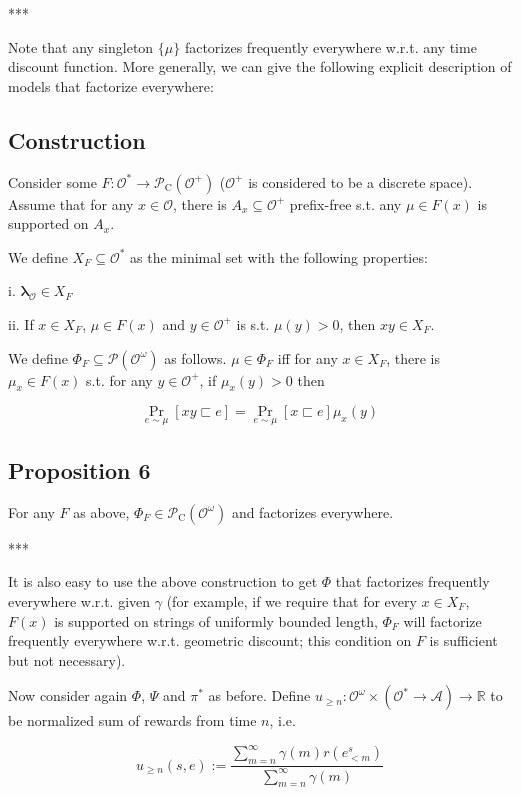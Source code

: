 \documentclass[a4paper]{article}
\DeclareMathOperator{\Prb}{Pr}
\newcommand{\Reals}{\mathbb{R}}
\newcommand{\Estr}{\bm{\lambda}}
\newcommand{\Prob}{\mathcal{P}}
\newcommand{\Act}{\mathcal{A}}
\newcommand{\Obs}{\mathcal{O}}
\newcommand{\ObsO}{\Obs^\omega}
\newcommand{\Pol}{\Obs^* \rightarrow \Act}
\newcommand{\CC}{\mathcal{P}_{\operatorname{C}}}
\begin{document}
***

Note that any singleton ${\{\mu\}}$ factorizes frequently everywhere w.r.t. any time discount function. More generally, we can give the following explicit description of models that factorize everywhere:

\subsection{Construction}

Consider some ${F: \Obs^* \rightarrow \CC(\Obs^+)}$ (${\Obs^+}$ is considered to be a discrete space). Assume that for any ${x \in \Obs}$, there is ${A_x \subseteq \Obs^+}$ prefix-free s.t. any ${\mu \in F(x)}$ is supported on ${A_x}$.

We define ${X_F \subseteq \Obs^*}$ as the minimal set with the following properties:

i. ${\Estr_\Obs \in X_F}$

ii. If ${x \in X_F}$, ${\mu \in F(x)}$ and ${y \in \Obs^+}$ is s.t. ${\mu(y) > 0}$, then ${xy \in X_F}$.

We define ${\Phi_F \subseteq \Prob(\ObsO)}$ as follows. ${\mu \in \Phi_F}$ iff for any ${x \in X_F}$, there is ${\mu_x \in F(x)}$ s.t. for any ${y \in \Obs^+}$, if ${\mu_x(y) > 0}$ then

$$\Prb_{e \sim \mu}[xy \sqsubset e] = \Prb_{e \sim \mu}[x \sqsubset e] \mu_x(y)$$

\subsection{Proposition 6}

For any ${F}$ as above, ${\Phi_F \in \CC(\ObsO)}$ and factorizes everywhere.

***

It is also easy to use the above construction to get ${\Phi}$ that factorizes frequently everywhere w.r.t. given ${\gamma}$ (for example, if we require that for every ${x \in X_F}$, ${F(x)}$ is supported on strings of uniformly bounded length, ${\Phi_F}$ will factorize frequently everywhere w.r.t. geometric discount; this condition on ${F}$ is sufficient but not necessary).

Now consider again ${\Phi}$, ${\Psi}$ and ${\pi^*}$ as before. Define ${u_{\geq n}: \ObsO \times (\Pol) \rightarrow \Reals}$ to be normalized sum of rewards from time ${n}$, i.e.

$$u_{\geq n}(s,e):=\frac{\sum_{m=n}^\infty \gamma(m)r(e^s_{<m})}{\sum_{m=n}^\infty \gamma(m)}$$
\end{document}
